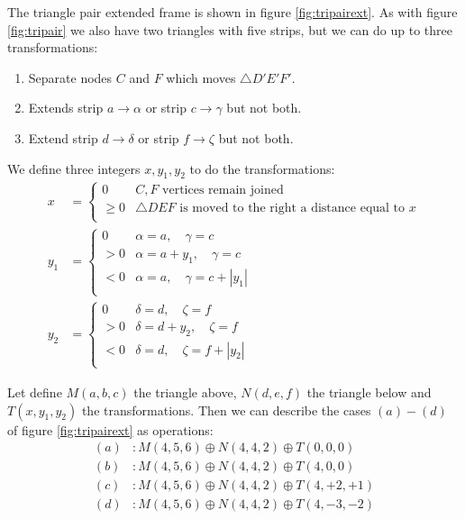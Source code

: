 \documentclass[11pt]{article}
\begin{document}
The triangle pair extended frame is shown in figure \ref{fig:tripairext}.
As with figure \ref{fig:tripair} we also have two triangles with five strips,
but we can do up to three transformations: 
\begin{enumerate}
 \item Separate nodes $C$ and $F$ which moves $\triangle{D'E'F'}$.
 \item Extends strip $a \rightarrow \alpha$ or strip $c \rightarrow \gamma$ but not both.
 \item Extend strip $d \rightarrow \delta$ or strip $f \rightarrow \zeta$ but not both.
\end{enumerate}

We define three integers $x, y_1, y_2$ to do the transformations:
\begin{align}
x &= \left \{ \begin{array}{rl}
 0       &  C,F \mbox{ vertices remain joined}\\
 \geq  0 &  \triangle{DEF} \mbox{ is moved to the right a distance equal to } x \\
 \end{array}\right. \\
y_1 &= \left \{ \begin{array}{rl}
 0   & \alpha = a,\quad \gamma = c \\
 > 0 & \alpha = a + y_1,\quad \gamma = c \\
 < 0 & \alpha = a,\quad \gamma = c + |y_1| \\
 \end{array}\right. \\ 
y_2 &= \left \{ \begin{array}{rl}
 0   & \delta = d,\quad \zeta = f \\
 > 0 & \delta = d + y_2,\quad \zeta = f \\
 < 0 & \delta = d,\quad \zeta = f + |y_2| \\
 \end{array}\right. 
\end{align}

Let define $M(a,b,c)$ the triangle above, $N(d,e,f)$ the triangle below and $T(x,y_1,y_2)$ the transformations.
Then we can describe the cases $(a)-(d)$ of figure \ref{fig:tripairext} as operations:
\begin{align*}
(a) &: M(4,5,6) \oplus N(4,4,2) \oplus T(0,0,0) \\
(b) &: M(4,5,6) \oplus N(4,4,2) \oplus T(4,0,0) \\
(c) &: M(4,5,6) \oplus N(4,4,2) \oplus T(4,+2,+1) \\
(d) &: M(4,5,6) \oplus N(4,4,2) \oplus T(4,-3,-2)
\end{align*}
\end{document}
